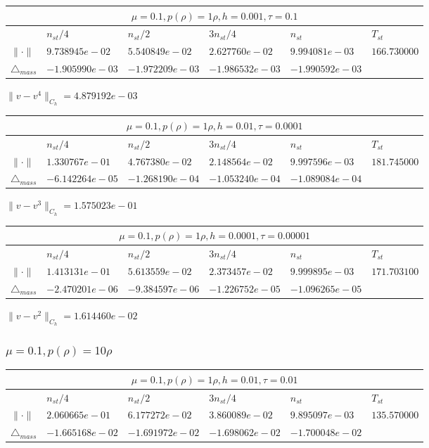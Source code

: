 \documentclass[12pt,a4paper]{article}
\begin{document}
\begin{tabular}{*{6}{|l}|}
    \hline
     \\
    \hline
    &$n_{st}/4 $&$ n_{st}/2$&$3n_{st}/4$&$n_{st}$&$T_{st}$ \\
    \hline
$\|\cdot \|$& $9.738945e-02$ & $5.540849e-02$ & $2.627760e-02$ & $9.994081e-03$ &$166.730000$\\
\hline
$\triangle_{mass}$& $-1.905990e-03$ & $-1.972209e-03$ & $-1.986532e-03$ & $-1.990592e-03$ &\\
\hline
\end{tabular}

$\|v-v^{4}\|_{C_h} = 4.879192e-03$

\begin{tabular}{*{6}{|l}|}
    \hline
     \\
    \hline
    &$n_{st}/4 $&$ n_{st}/2$&$3n_{st}/4$&$n_{st}$&$T_{st}$ \\
    \hline
    $\|\cdot \|$& $1.330767e-01$ & $4.767380e-02$ & $2.148564e-02$ & $9.997596e-03$ &$181.745000$\\
\hline
$\triangle_{mass}$& $-6.142264e-05$ & $-1.268190e-04$ & $-1.053240e-04$ & $-1.089084e-04$ &\\
\hline
\end{tabular}

$\|v-v^{3}\|_{C_h} = 1.575023e-01$

\begin{tabular}{*{6}{|l}|}
    \hline
     \\
    \hline
    &$n_{st}/4 $&$ n_{st}/2$&$3n_{st}/4$&$n_{st}$&$T_{st}$ \\
    \hline
$\|\cdot \|$& $1.413131e-01$ & $5.613559e-02$ & $2.373457e-02$ & $9.999895e-03$ &$171.703100$\\
\hline
$\triangle_{mass}$& $-2.470201e-06$ & $-9.384597e-06$ & $-1.226752e-05$ & $-1.096265e-05$ &\\
\hline
\end{tabular}

$\|v-v^{2}\|_{C_h} = 1.614460e-02$

\subsubsection{$\mu = 0.1, p(\rho) = 10\rho $}

\begin{tabular}{*{6}{|l}|}
    \hline
     \\
    \hline
    &$n_{st}/4 $&$ n_{st}/2$&$3n_{st}/4$&$n_{st}$&$T_{st}$ \\
    \hline
$\|\cdot \|$& $2.060665e-01$ & $6.177272e-02$ & $3.860089e-02$ & $9.895097e-03$ &$135.570000$\\
\hline
$\triangle_{mass}$& $-1.665168e-02$ & $-1.691972e-02$ & $-1.698062e-02$ & $-1.700048e-02$ &\\
\hline    
\end{tabular}
\end{document}
